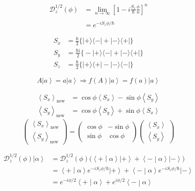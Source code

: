 \documentclass{article}
\newcommand{\ket}[1]{\ensuremath{\left|#1\right\rangle}}
\newcommand{\bracket}[2]{\ensuremath{\left\langle #1 \middle| #2 \right\rangle}}
\newcommand{\expectation}[1]{\ensuremath{\left\langle #1 \right\rangle}}
\newcommand{\outter}[2]{\ensuremath{| #1 \rangle\!\langle #2 |} }
\begin{document}
\begin{align}
  \mathcal{D}_z^{1/2}(\phi) &= \lim\limits_{n\to \infty}\left[ 1-i\frac{S_z}{\hbar}\frac{\phi}{n} \right]^n \nonumber\\
  &\nonumber \\
  &= \displaystyle{e^{-iS_z\phi/\hbar}} \nonumber
\end{align}

\begin{align}
  S_x &= \frac{\hbar}{2}\Big\{ \outter{+}{-} +\outter{-}{+}\Big\}\nonumber\\
  S_y &= \frac{\hbar i}{2}\Big\{ -\outter{+}{-}+\outter{-}{+} \Big\}\nonumber\\
  S_z &= \frac{\hbar}{2}\Big\{ \outter{+}{+}-\outter{-}{-} \Big\}
\end{align}

\begin{equation*}
  A\ket{a}=a\ket{a}\Rightarrow f(A)\ket{a} = f(a)\ket{a}
\end{equation*}

\begin{align}
  \expectation{S_x}_\text{new} &= \cos\phi \expectation{S_x}-\sin\phi\expectation{S_y} \nonumber\\
  \expectation{S_y}_\text{new} &= \cos\phi \expectation{S_y}+\sin\phi\expectation{S_x} \nonumber
\end{align}
\begin{equation}
  \begin{pmatrix} \expectation{S_x}_\text{new}\\ \expectation{S_y}_\text{new} \end{pmatrix} = \begin{pmatrix}
    \cos\phi & -\sin\phi \\
    \sin\phi & \cos\phi
  \end{pmatrix}\begin{pmatrix}\expectation{S_x}\\ \expectation{S_y}\end{pmatrix}
\end{equation}

\begin{align}
  \mathcal{D}_z^{1/2}(\phi)\ket{\alpha} &= \mathcal{D}_z^{1/2}(\phi)\Big( \bracket{+}{\alpha}\ket{+}+\bracket{-}{\alpha}\ket{-} \Big)\\
                                        &=  \bracket{+}{\alpha}e^{-iS_z\phi/\hbar}\ket{+}+\bracket{-}{\alpha} e^{-iS_z\phi/\hbar}\ket{-}\\
                                          &= e^{-i\phi/2}\bracket{+}{\alpha}+e^{i\phi/2}\bracket{-}{\alpha}
\end{align}
\end{document}
